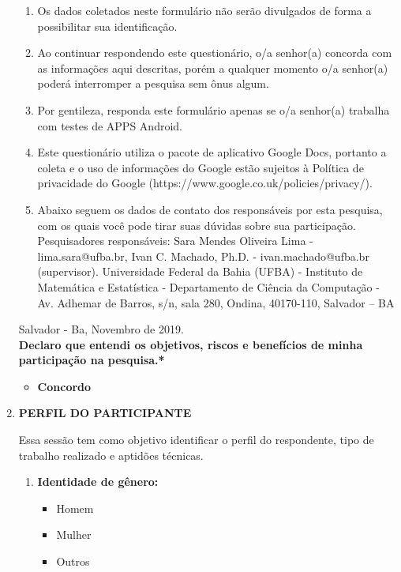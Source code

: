 \begin{enumerate}[label=\bf A\arabic*,leftmargin=1.8cm]
\begin{enumerate}[label= \arabic*]
        \item Os dados coletados neste formulário não serão divulgados de forma a possibilitar sua identificação.
        \item Ao continuar respondendo este questionário, o/a senhor(a) concorda com as informações aqui descritas, porém a qualquer momento o/a senhor(a) poderá interromper a pesquisa sem ônus algum.
        \item Por gentileza, responda este formulário apenas se o/a senhor(a) trabalha com testes de \ac{APPS} Android.
        \item Este questionário utiliza o pacote de aplicativo Google Docs, portanto a coleta e o uso de informações do Google estão sujeitos à Política de privacidade do Google (https://www.google.co.uk/policies/privacy/).
        \item Abaixo seguem os dados de contato dos responsáveis por esta pesquisa, com os quais você pode tirar suas dúvidas sobre sua participação. Pesquisadores responsáveis: Sara Mendes Oliveira Lima - lima.sara@ufba.br, Ivan C. Machado, Ph.D. - ivan.machado@ufba.br (supervisor). Universidade Federal da Bahia (UFBA) - Instituto de Matemática e Estatística - Departamento de Ciência da Computação - Av. Adhemar de Barros, s/n, sala 280, Ondina, 40170-110, Salvador – BA
    \end{enumerate}
    
    
    Salvador - Ba, Novembro de 2019.\\
    
    
    
    \textbf{Declaro que entendi os objetivos, riscos e benefícios de minha participação na pesquisa.*}

    \begin{itemize}
        \item \textbf{Concordo}
    \end{itemize}
    
    

    \item \textbf{PERFIL DO PARTICIPANTE}
    
    Essa sessão tem como objetivo identificar o perfil do respondente, tipo de trabalho realizado e aptidões técnicas.
    
     \begin{enumerate}[label= \arabic*]
     
        \item \textbf{Identidade de gênero:}
        \begin{itemize}
            \item Homem
            \item Mulher
            \item Outros
        \end{itemize}
        

\end{enumerate}
\end{enumerate}
